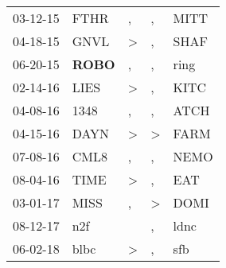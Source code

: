 \begin{supertabular}{p{0.07\textwidth}p{0.06\textwidth}p{0.02\textwidth}p{0.02\textwidth}p{0.06\textwidth}}
 03-12-15\textsuperscript{} &           FTHR\textsuperscript{} &             , &             , &  MITT\textsuperscript{} \\
 04-18-15\textsuperscript{} &           GNVL\textsuperscript{} &  \textgreater &             , &  SHAF\textsuperscript{} \\
 06-20-15\textsuperscript{} &  \textbf{ROBO\textsuperscript{}} &             , &             , &  ring\textsuperscript{} \\
 02-14-16\textsuperscript{} &           LIES\textsuperscript{} &  \textgreater &             , &  KITC\textsuperscript{} \\
 04-08-16\textsuperscript{} &           1348\textsuperscript{} &             , &             , &  ATCH\textsuperscript{} \\
 04-15-16\textsuperscript{} &           DAYN\textsuperscript{} &  \textgreater &  \textgreater &  FARM\textsuperscript{} \\
 07-08-16\textsuperscript{} &           CML8\textsuperscript{} &             , &             , &  NEMO\textsuperscript{} \\
 08-04-16\textsuperscript{} &           TIME\textsuperscript{} &  \textgreater &             , &   EAT\textsuperscript{} \\
 03-01-17\textsuperscript{} &           MISS\textsuperscript{} &             , &  \textgreater &  DOMI\textsuperscript{} \\
 08-12-17\textsuperscript{} &            n2f\textsuperscript{} &               &             , &  ldnc\textsuperscript{} \\
 06-02-18\textsuperscript{} &           blbc\textsuperscript{} &  \textgreater &             , &   sfb\textsuperscript{} \\
\end{supertabular}
